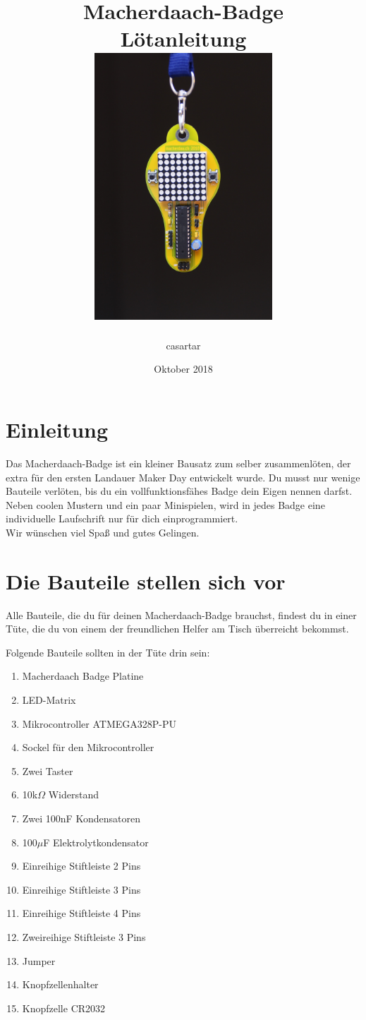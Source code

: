 \documentclass{article}
\title{Macherdaach-Badge \\ Lötanleitung \\ [1cm]
\includegraphics[width=0.5\textwidth]{Bilder/IMG_5645.JPG}
}
\date{Oktober 2018}
\author{casartar}
\begin{document}
\maketitle
\newpage
\section{Einleitung}

Das Macherdaach-Badge ist ein kleiner Bausatz zum selber zusammenlöten, der extra für den ersten Landauer Maker Day entwickelt wurde.
Du musst nur wenige Bauteile verlöten, bis du ein vollfunktionsfähes Badge dein Eigen nennen darfst. Neben coolen Mustern und ein paar Minispielen, wird in jedes Badge eine individuelle Laufschrift nur für dich einprogrammiert.\\

Wir wünschen viel Spaß und gutes Gelingen. 

\section{Die Bauteile stellen sich vor}
Alle Bauteile, die du für deinen Macherdaach-Badge brauchst, findest du in einer Tüte, die du von einem der freundlichen Helfer  am Tisch überreicht bekommst.

Folgende Bauteile sollten in der Tüte drin sein:

\begin{enumerate}
	\item Macherdaach Badge Platine
	\item LED-Matrix
	\item Mikrocontroller ATMEGA328P-PU
	\item Sockel für den Mikrocontroller
	\item Zwei Taster
	\item 10k$\Omega$ Widerstand
	\item Zwei 100nF Kondensatoren
	\item 100$\mu$F Elektrolytkondensator
	\item Einreihige Stiftleiste 2 Pins
	\item Einreihige Stiftleiste 3 Pins
	\item Einreihige Stiftleiste 4 Pins
	\item Zweireihige Stiftleiste 3 Pins
	\item Jumper
	\item Knopfzellenhalter
	\item Knopfzelle CR2032
\end{enumerate}
\end{document}
